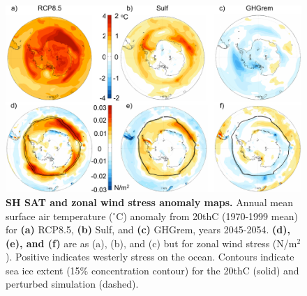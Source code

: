 \documentclass{nature}
\begin{document}
\begin{figure}%
 \noindent\includegraphics[width=30pc]{figures/SHmaps3.pdf}
\caption{\textbf{SH SAT and zonal wind stress anomaly maps.} Annual mean surface air temperature ($^\circ$C) anomaly from 20thC (1970-1999 mean) for \textbf{(a)} RCP8.5, \textbf{(b)} Sulf, and \textbf{(c)} GHGrem, years 2045-2054. \textbf{(d), (e), and (f)} are as (a), (b), and (c) but for zonal wind stress (N/m$^2$). Positive indicates westerly stress on the ocean. Contours indicate sea ice extent (15\% concentration contour) for the 20thC (solid) and perturbed simulation (dashed).}
\label{fig:shmaps}
\end{figure}
\end{document}
